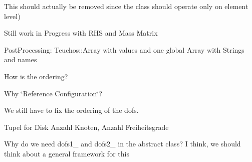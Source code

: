 
\begin{DoxyRefList}
\item[Class \mbox{\hyperlink{classFEDD_1_1AssembleFE}{FEDD\+::Assemble\+FE\texorpdfstring{$<$}{<} SC, LO, GO, NO \texorpdfstring{$>$}{>}}} ]\label{todo__todo000001}%
%
This should actually be removed since the class should operate only on element level)  
\item[Member \mbox{\hyperlink{classFEDD_1_1AssembleFE_a9eea5124c4b385c2807ad8b20614d050}{FEDD\+::Assemble\+FE\texorpdfstring{$<$}{<} SC, LO, GO, NO \texorpdfstring{$>$}{>}\+::add\+RHSFunc}} (Rhs\+Func\+\_\+\+Type rhs\+Func)]\label{todo__todo000005}%
%
Still work in Progress with RHS and Mass Matrix  
\item[Member \mbox{\hyperlink{classFEDD_1_1AssembleFE_a35ada89164c74b433340733c01f30f4b}{FEDD\+::Assemble\+FE\texorpdfstring{$<$}{<} SC, LO, GO, NO \texorpdfstring{$>$}{>}\+::get\+Dim}} ()]\label{todo__todo000003}%
%
Post\+Processing\+: Teuchos\+::\+Array with values and one global Array with Strings and names  
\item[Member \mbox{\hyperlink{classFEDD_1_1AssembleFE_a93f37b5e5f8f9a73152abb2e8be4ba4f}{FEDD\+::Assemble\+FE\texorpdfstring{$<$}{<} SC, LO, GO, NO \texorpdfstring{$>$}{>}\+::get\+Nodes\+Ref\+Config}} ()]\label{todo__todo000004}%
%
How is the ordering?  
\item[Member \mbox{\hyperlink{classFEDD_1_1AssembleFE_ab2892bff598d5a4f784d4f30ddf4836c}{FEDD\+::Assemble\+FE\texorpdfstring{$<$}{<} SC, LO, GO, NO \texorpdfstring{$>$}{>}\+::nodes\+Ref\+Config\+\_\+}} ]\label{todo__todo000006}%
%
Why \char`\"{}\+Reference Configuration\char`\"{}?  
\item[Member \mbox{\hyperlink{classFEDD_1_1AssembleFE_a5303adf0752fe27d9ff47ae8a39c1da4}{FEDD\+::Assemble\+FE\texorpdfstring{$<$}{<} SC, LO, GO, NO \texorpdfstring{$>$}{>}\+::update\+Solution}} (vec\+\_\+dbl\+\_\+\+Type solution)]\label{todo__todo000002}%
%
We still have to fix the ordering of the dofs.  
\item[Member \mbox{\hyperlink{classFEDD_1_1AssembleFEAceLaplace_a0899c869aa01d6a2730b2d5c6d70af22}{FEDD\+::Assemble\+FEAce\+Laplace\texorpdfstring{$<$}{<} SC, LO, GO, NO \texorpdfstring{$>$}{>}\+::assembly\+Laplacian}} (Small\+Matrix\+Ptr\+\_\+\+Type \&element\+Matrix)]\label{todo__todo000007}%
%
Tupel for Disk Anzahl Knoten, Anzahl Freiheitsgrade  
\item[Member \mbox{\hyperlink{classFEDD_1_1AssembleFEAceNavierStokes_ab9f645b7c95c753306f55b0719c320c4}{FEDD\+::Assemble\+FEAce\+Navier\+Stokes\texorpdfstring{$<$}{<} SC, LO, GO, NO \texorpdfstring{$>$}{>}\+::dofs\+Velocity\+\_\+}} ]\label{todo__todo000008}%
%
Why do we need dofs1\+\_\+ and dofs2\+\_\+ in the abstract class? I think, we should think about a general framework for this 




\end{DoxyRefList}
